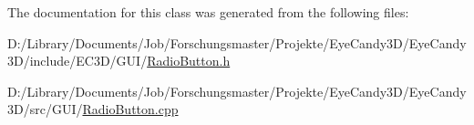 The documentation for this class was generated from the following files\+:\begin{DoxyCompactItemize}
\item 
D\+:/\+Library/\+Documents/\+Job/\+Forschungsmaster/\+Projekte/\+Eye\+Candy3\+D/\+Eye\+Candy3\+D/include/\+E\+C3\+D/\+G\+U\+I/\mbox{\hyperlink{_radio_button_8h}{Radio\+Button.\+h}}\item 
D\+:/\+Library/\+Documents/\+Job/\+Forschungsmaster/\+Projekte/\+Eye\+Candy3\+D/\+Eye\+Candy3\+D/src/\+G\+U\+I/\mbox{\hyperlink{_radio_button_8cpp}{Radio\+Button.\+cpp}}\end{DoxyCompactItemize}
